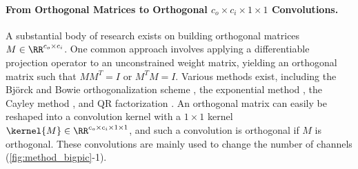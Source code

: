     \paragraph{From Orthogonal Matrices to Orthogonal $c_o \times c_i\times 1 \times 1$ Convolutions.}  
    A substantial body of research exists on building orthogonal matrices $M \in \RR^{c_o \times c_i}$. One common approach involves applying a differentiable projection operator to an unconstrained weight matrix, yielding an orthogonal matrix such that $M M^T = I$ or $M^T M = I$. Various methods exist, including the Björck and Bowie orthogonalization scheme \cite{bjorck1971iterative}, the exponential method \cite{singla_skew_2021}, the Cayley method \cite{trockman_orthogonalizing_2021}, and QR factorization \cite{van2018sylvester}. An orthogonal matrix can easily be reshaped into a convolution kernel with a $1 \times 1$ kernel $\kernel{M} \in \RR^{c_o \times c_i \times 1 \times 1}$, and such a convolution is orthogonal if $M$ is orthogonal. These convolutions are mainly used to change the number of channels (\cref{fig:method_bigpic}-1).
    
